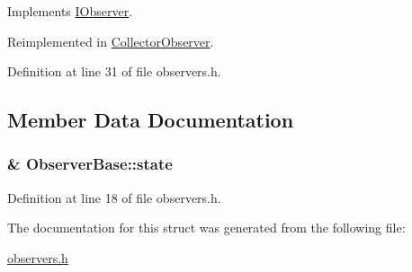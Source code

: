 Implements \hyperlink{struct_i_observer_a87304ed05adacf4219c5e4252629ae14}{I\+Observer}.



Reimplemented in \hyperlink{struct_collector_observer_adebc5768f5778ceb3e981362363db247}{Collector\+Observer}.



Definition at line 31 of file observers.\+h.



\subsection{Member Data Documentation}
\subsubsection[{\texorpdfstring{state}{state}}]{\& Observer\+Base\+::state\hspace{0.3cm}{\ttfamily [protected]}}\hypertarget{struct_observer_base_a107ad54040309605fa5fafd481b97f2f}{}\label{struct_observer_base_a107ad54040309605fa5fafd481b97f2f}


Definition at line 18 of file observers.\+h.



The documentation for this struct was generated from the following file\+:\begin{DoxyCompactItemize}
\item 
\hyperlink{observers_8h}{observers.\+h}\end{DoxyCompactItemize}
